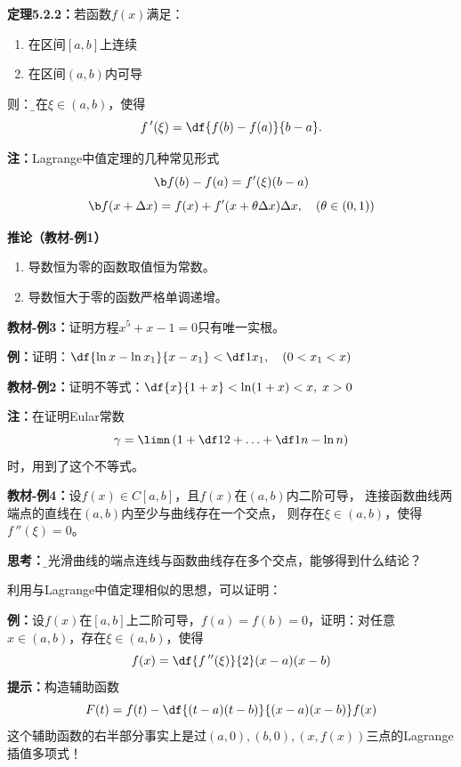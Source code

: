{\bf 定理5.2.2：}若函数$f(x)$满足： 
\begin{enumerate}[(1)]
  \setlength{\itemindent}{1cm}
  \item 在区间$[a,b]$上连续 
  \item 在区间$(a,b)$内可导 
\end{enumerate}
则：{\b 存在$\xi\in(a,b)$，使得 
$$f\,'(\xi)=\df{f(b)-f(a)}{b-a}.$$}

{\bf 注：}Lagrange中值定理的几种常见形式
$${\b f(b)-f(a)=f'(\xi)(b-a)}$$
$${\b f(x+\Delta x)=f(x)+f'(x+\theta\Delta x)\Delta x,
\quad (\theta\in(0,1))}$$

{\bf 推论（教材-例1）}
\begin{enumerate}[(1)]
  \setlength{\itemindent}{1cm}
  \item 导数恒为零的函数取值恒为常数。
  \item 导数恒大于零的函数严格单调递增。
\end{enumerate}

{\bf 教材-例3：}证明方程$x^5+x-1=0$只有唯一实根。

{\bf 例：}证明：$\df{\ln x-\ln x_1}{x-x_1}<\df 1{x_1},\quad (0<x_1<x)$

{\bf 教材-例2：}证明不等式：$\df{x}{1+x}<\ln(1+x)<x,\;x>0$

{\bf 注：}在证明Eular常数
$$\gamma=\limn\left(1+\df12+\ldots+\df1n-\ln n\right)$$
时，用到了这个不等式。

{\bf 教材-例4：}设$f(x)\in C[a,b]$，且$f(x)$在$(a,b)$内二阶可导，
连接函数曲线两端点的直线在$(a,b)$内至少与曲线存在一个交点，
则存在$\xi\in(a,b)$，使得$f\,''(\xi)=0$。

{\bf 思考：}{\b 若光滑曲线的端点连线与函数曲线存在多个交点，能够得到什么结论？}

利用与Lagrange中值定理相似的思想，可以证明：

{\bf 例：}设$f(x)$在$[a,b]$上二阶可导，$f(a)=f(b)=0$，证明：对任意
$x\in(a,b)$，存在$\xi\in(a,b)$，使得
$$f(x)=\df{f\,''(\xi)}{2}(x-a)(x-b)$$
{\bf 提示：}构造辅助函数
$$F(t)=f(t)-\df{(t-a)(t-b)}{(x-a)(x-b)}f(x)$$
这个辅助函数的右半部分事实上是过$(a,0),(b,0),(x,f(x))$三点的Lagrange插值多项式！

